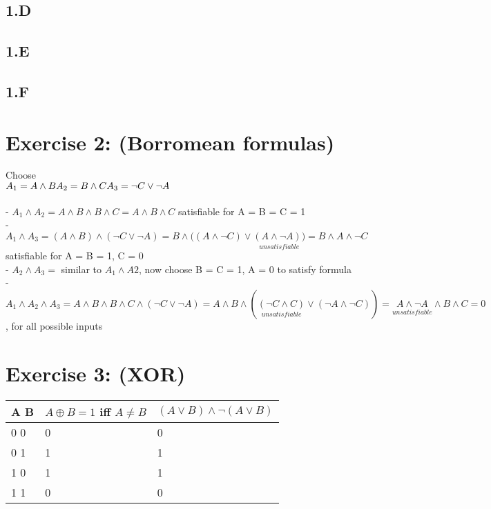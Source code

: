\documentclass[12pt]{article}
\begin{document}
\subsection*{1.D}

\subsection*{1.E}

\subsection*{1.F}


\section*{Exercise 2: (Borromean formulas)}

Choose \\
$ 
A_1 = A \land B \\
A_2 = B \land C \\
A_3 = \neg C \lor \neg A 
$ \\ \\
- $
	A_1 \land A_2 = A \land B \land B \land C = A \land B \land C $ 
	satisfiable for A = B = C = 1 \\
- $	A_1 \land A_3 = (A \land B) \land (\neg C \lor \neg A) = B \land ( (A \land \neg C) \lor \underset{unsatisfiable}{(A \land \neg A)) } = B \land A \land \neg C
	$ \\ satisfiable for A = B = 1, C = 0 \\
- $A_2 \land A_3 =$ similar to $A_1 \land A2
$, now choose B = C = 1, A = 0 to satisfy formula \\
- $A_1 \land A_2 \land A_3 = A \land B \land B \land C \land (\neg C \lor \neg A) = A \land B \land (\underset{unsatisfiable}{(\neg C \land C)}\lor(\neg A \land \neg C)) = \underset{unsatisfiable}{A \land \neg A} \land B \land C = 0
$ , for all possible inputs \\

\section*{Exercise 3: (XOR)}

\begin{tabular}{  l | l | l }
	A B & $ A \oplus B = 1 $ iff $A \neq B$ & $ (A \lor B) \land \neg(A \lor B) $ \\ \hline
	0 0 & 0 & 0 \\
	0 1 & 1 & 1 \\
	1 0 & 1 & 1 \\
	1 1 & 0 & 0 \\
\end{tabular} 
\\
\end{document}
